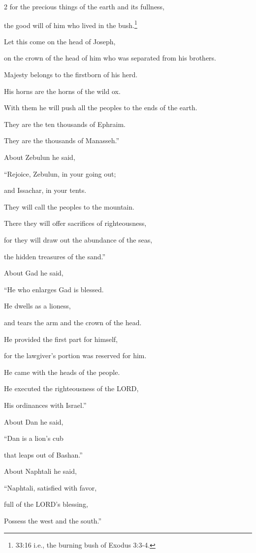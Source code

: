 \begin{multicols}{2}
\myverse{}for the precious things of the earth and its fullness,

the good will of him who lived in the bush.\footnote{33:16 i.e., the burning bush of
	Exodus 3:3-4.}

Let this come on the head of Joseph,

on the crown of the head of him who was separated from his brothers.

\myverse{}Majesty belongs to the firstborn of his herd.

His horns are the horns of the wild ox.

With them he will push all the peoples to the ends of the earth.

They are the ten thousands of Ephraim.

They are the thousands of Manasseh.”

\myverse{}About Zebulun he said,

“Rejoice, Zebulun, in your going out;

and Issachar, in your tents.

\myverse{}They will call the peoples to the mountain.

There they will offer sacrifices of righteousness,

for they will draw out the abundance of the seas,

the hidden treasures of the sand.”

\myverse{}About Gad he said,

“He who enlarges Gad is blessed.

He dwells as a lioness,

and tears the arm and the crown of the head.

\myverse{}He provided the first part for himself,

for the lawgiver’s portion was reserved for him.

He came with the heads of the people.

He executed the righteousness of the LORD,

His ordinances with Israel.”

\myverse{}About Dan he said,

“Dan is a lion’s cub

that leaps out of Bashan.”

\myverse{}About Naphtali he said,

“Naphtali, satisfied with favor,

full of the LORD’s blessing,

Possess the west and the south.”


\end{multicols}
